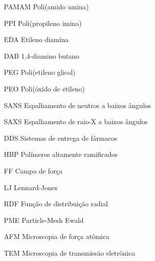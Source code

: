 \documentclass[
	12pt,				%
	openright,			%
	twoside,			%
	a4paper,			%
	english,			%
	french,				%
	spanish,			%
	brazil				%
	]{abntex2}
\begin{document}
\listoffigures*
\cleardoublepage

\listoftables*
\cleardoublepage

\begin{siglas}
  \item[PAMAM] Poli(amido amina)
  \item[PPI] Poli(propileno imina)
  \item[EDA] Etileno diamina
  \item[DAB] 1,4-diamino butano
  \item[PEG] Poli(etileno glicol)
  \item[PEO] Poli(óxido de etileno)
  \item[SANS] Espalhamento de neutros a baixos ângulos
  \item[SAXS] Espalhamento de raio-X a baixos ângulos
  \item[DDS] Sistemas de entrega de fármacos
  \item[HBP] Polímeros altamente ramificados
  \item[FF] Campo de força
  \item[LJ] Lennard-Jones
  \item[RDF] Função de distribuição radial
  \item[PME] Particle-Mesh Ewald
  \item[AFM] Microscopia de força atômica
  \item[TEM] Microscopia de transmissão eletrônica
\end{siglas}
\end{document}
